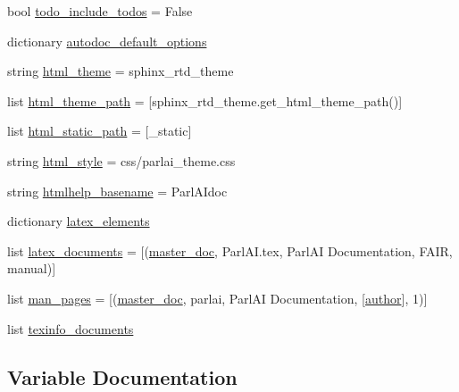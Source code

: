 \begin{DoxyCompactItemize}
\item 
bool \hyperlink{namespaceconf_a8fe7f0d85f975f4ecba5cb6066959a09}{todo\+\_\+include\+\_\+todos} = False
\item 
dictionary \hyperlink{namespaceconf_ae1323788e132618f5d7b9839f2adc5e3}{autodoc\+\_\+default\+\_\+options}
\item 
string \hyperlink{namespaceconf_a6c3bfcc1a44546c1c75ce20f55bd0fd6}{html\+\_\+theme} = \textquotesingle{}sphinx\+\_\+rtd\+\_\+theme\textquotesingle{}
\item 
list \hyperlink{namespaceconf_a4960231f83b1b44a1ffcd212903b62e8}{html\+\_\+theme\+\_\+path} = \mbox{[}sphinx\+\_\+rtd\+\_\+theme.\+get\+\_\+html\+\_\+theme\+\_\+path()\mbox{]}
\item 
list \hyperlink{namespaceconf_af4fb5d8851ccaade135c2668dd3ced41}{html\+\_\+static\+\_\+path} = \mbox{[}\textquotesingle{}\+\_\+static\textquotesingle{}\mbox{]}
\item 
string \hyperlink{namespaceconf_a5622a8722272baed29b41d8771ecbe3c}{html\+\_\+style} = \textquotesingle{}css/parlai\+\_\+theme.\+css\textquotesingle{}
\item 
string \hyperlink{namespaceconf_aab7fddb2766ce3c430d8246fbfdbc7b1}{htmlhelp\+\_\+basename} = \textquotesingle{}Parl\+A\+Idoc\textquotesingle{}
\item 
dictionary \hyperlink{namespaceconf_a33619d385ad23765ac6ebb58bf82d43d}{latex\+\_\+elements}
\item 
list \hyperlink{namespaceconf_a7812f49970f3de0d15dd7b9b9a10e3a1}{latex\+\_\+documents} = \mbox{[}(\hyperlink{namespaceconf_a6fcd7e5236f355b1e1a55f9d95988810}{master\+\_\+doc}, \textquotesingle{}Parl\+A\+I.\+tex\textquotesingle{}, \textquotesingle{}Parl\+AI Documentation\textquotesingle{}, \textquotesingle{}F\+A\+IR\textquotesingle{}, \textquotesingle{}manual\textquotesingle{})\mbox{]}
\item 
list \hyperlink{namespaceconf_a85efc5fee48a26fa2d651f6eeb38fc2b}{man\+\_\+pages} = \mbox{[}(\hyperlink{namespaceconf_a6fcd7e5236f355b1e1a55f9d95988810}{master\+\_\+doc}, \textquotesingle{}parlai\textquotesingle{}, \textquotesingle{}Parl\+AI Documentation\textquotesingle{}, \mbox{[}\hyperlink{namespaceconf_a637c239d256432248aa8d9f3ab0b8c52}{author}\mbox{]}, 1)\mbox{]}
\item 
list \hyperlink{namespaceconf_a54b0faed214ac92017d5689efbb10672}{texinfo\+\_\+documents}
\end{DoxyCompactItemize}


\subsection{Variable Documentation}
\mbox{\label{namespaceconf_a637c239d256432248aa8d9f3ab0b8c52}} 
